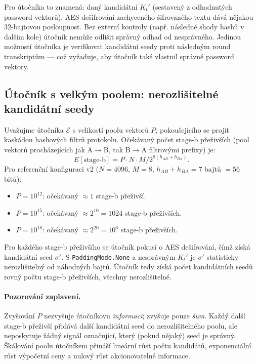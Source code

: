 \documentclass[11pt,a4paper]{article}
\begin{document}
Pro útočníka to znamená: daný kandidátní $K_t'$ (sestavený z odhadnutých password vektorů), AES dešifrování zachyceného šifrovaného textu dává nějakou 32-bajtovou posloupnost. Bez externí kontroly (např. následné shody hashů v dalším kole) útočník nemůže odlišit správný odhad od nesprávného. Jedinou možností útočníka je verifikovat kandidátní seedy proti následným round transkriptům --- což vyžaduje, aby útočník také vlastnil správné password vektory.

\subsection{Útočník s velkým poolem: nerozlišitelné kandidátní seedy}\label{sec:flooding}

Uvažujme útočníka $\mathcal{E}$ s velikostí poolu vektorů $P$, pokoušejícího se projít kaskádou hashových filtrů protokolu. Očekávaný počet stage-b přeživších (pool vektorů procházejících jak A$\to$B, tak B$\to$A filtrovými prefixy) je:
\[
E[\text{stage-b}] = P \cdot N \cdot M / 2^{8(h_{AB} + h_{BA})}.
\]
Pro referenční konfiguraci v2 ($N = 4096$, $M = 8$, $h_{AB} + h_{BA} = 7$ bajtů $= 56$ bitů):

\begin{itemize}[leftmargin=*]
\item $P = 10^{12}$: očekávaný $\approx 1$ stage-b přeživší.
\item $P = 10^{15}$: očekávaný $\approx 2^{10} = 1024$ stage-b přeživších.
\item $P = 10^{18}$: očekávaný $\approx 2^{20} = 10^{6}$ stage-b přeživších.
\end{itemize}

Pro každého stage-b přeživšího se útočník pokusí o AES dešifrování, čímž získá kandidátní seed $\sigma'$. S \texttt{PaddingMode.None} a nesprávným $K_t'$ je $\sigma'$ statisticky nerozlišitelný od náhodných bajtů. Útočník tedy získá počet kandidátních seedů rovný počtu stage-b přeživších, všechny nerozlišitelné.

\paragraph{Pozorování zaplavení.} Zvyšování $P$ nezvyšuje útočníkovu \emph{informaci}; zvyšuje pouze \emph{šum}. Každý další stage-b přeživší přidává další kandidátní seed do nerozlišitelného poolu, ale neposkytuje žádný signál označující, který (pokud nějaký) seed je správný. Škálování poolu útočníkem přináší lineární růst počtu kandidátů, exponenciální růst výpočetní ceny a nulový růst akcionovatelné informace.
\end{document}
